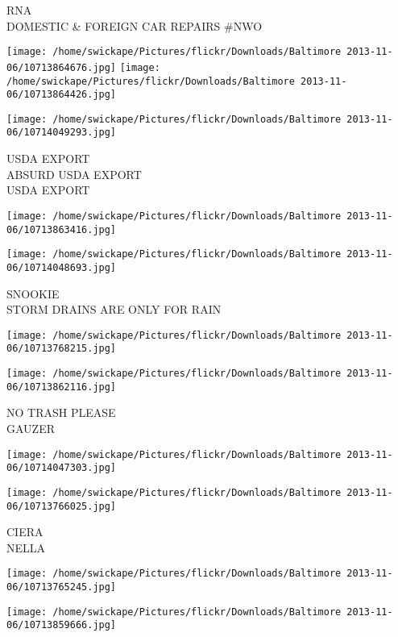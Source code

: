\documentclass[10pt,letterpaper]{article}
\begin{document}
RNA\\
DOMESTIC \& FOREIGN CAR REPAIRS \#NWO\\
\pagebreak

\texttt{[image: /home/swickape/Pictures/flickr/Downloads/Baltimore 2013-11-06/10713864676.jpg]}
\texttt{[image: /home/swickape/Pictures/flickr/Downloads/Baltimore 2013-11-06/10713864426.jpg]}

\texttt{[image: /home/swickape/Pictures/flickr/Downloads/Baltimore 2013-11-06/10714049293.jpg]}

USDA EXPORT\\
ABSURD USDA EXPORT\\
USDA EXPORT\\
\pagebreak

\texttt{[image: /home/swickape/Pictures/flickr/Downloads/Baltimore 2013-11-06/10713863416.jpg]}

\vspace{0.25in}
\texttt{[image: /home/swickape/Pictures/flickr/Downloads/Baltimore 2013-11-06/10714048693.jpg]}

SNOOKIE\\
STORM DRAINS ARE ONLY FOR RAIN\\
\pagebreak

\texttt{[image: /home/swickape/Pictures/flickr/Downloads/Baltimore 2013-11-06/10713768215.jpg]}

\vspace{0.25in}
\texttt{[image: /home/swickape/Pictures/flickr/Downloads/Baltimore 2013-11-06/10713862116.jpg]}

NO TRASH PLEASE\\
GAUZER\\
\pagebreak

\texttt{[image: /home/swickape/Pictures/flickr/Downloads/Baltimore 2013-11-06/10714047303.jpg]}

\vspace{0.25in}
\texttt{[image: /home/swickape/Pictures/flickr/Downloads/Baltimore 2013-11-06/10713766025.jpg]}

CIERA\\
NELLA\\
\pagebreak

\texttt{[image: /home/swickape/Pictures/flickr/Downloads/Baltimore 2013-11-06/10713765245.jpg]}

\vspace{0.25in}
\texttt{[image: /home/swickape/Pictures/flickr/Downloads/Baltimore 2013-11-06/10713859666.jpg]}
\end{document}
